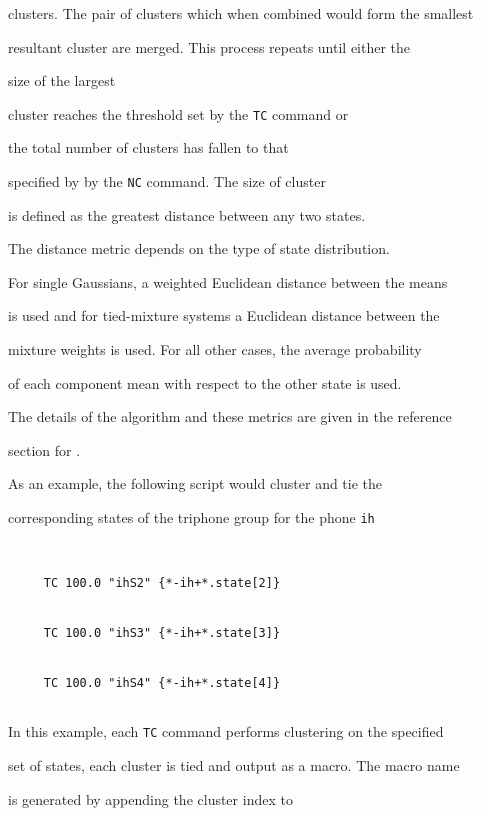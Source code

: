 clusters.  The pair of clusters which when combined would form the smallest


resultant cluster are merged.  This process repeats until either the


size of the largest


cluster reaches the threshold set by the \texttt{TC} command or


the total number of clusters has fallen to that


specified by by the \texttt{NC} command.  The size of cluster


is defined as the greatest distance between any two states.


The distance metric depends on the type of state distribution.


For single Gaussians, a weighted Euclidean distance between the means


is used and for tied-mixture systems a  Euclidean distance between the


mixture weights is used.  For all other cases, the average probability


of each component mean with respect to the other state is used.


The details of the algorithm and these metrics are given in the reference


section for .










As an example, the following  script would cluster and tie the


corresponding states of the triphone group for the phone \texttt{ih}


\begin{verbatim}


     TC 100.0 "ihS2" {*-ih+*.state[2]}


     TC 100.0 "ihS3" {*-ih+*.state[3]}


     TC 100.0 "ihS4" {*-ih+*.state[4]}


\end{verbatim}


In this example, each \texttt{TC} command performs clustering on the specified


set of states, each cluster is  tied and output as a macro.  The macro name


is generated by appending the cluster index to


